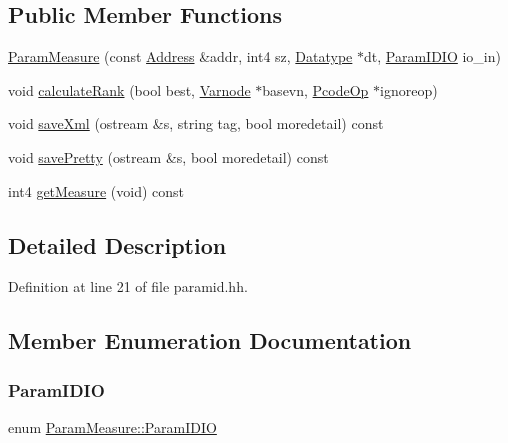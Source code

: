 \subsection*{Public Member Functions}
\begin{DoxyCompactItemize}
\item 
\mbox{\hyperlink{class_param_measure_a75cc959002e4d340d6f2196c48da1acf}{Param\+Measure}} (const \mbox{\hyperlink{class_address}{Address}} \&addr, int4 sz, \mbox{\hyperlink{class_datatype}{Datatype}} $\ast$dt, \mbox{\hyperlink{class_param_measure_a5d9dfe68f44efa9c011528a173f76fec}{Param\+I\+D\+IO}} io\+\_\+in)
\item 
void \mbox{\hyperlink{class_param_measure_a57b2f96e633cb22786292e004b9e37ae}{calculate\+Rank}} (bool best, \mbox{\hyperlink{class_varnode}{Varnode}} $\ast$basevn, \mbox{\hyperlink{class_pcode_op}{Pcode\+Op}} $\ast$ignoreop)
\item 
void \mbox{\hyperlink{class_param_measure_a53d9f454f92708e2e61a60c83222fe7a}{save\+Xml}} (ostream \&s, string tag, bool moredetail) const
\item 
void \mbox{\hyperlink{class_param_measure_a3f7a68d5a3978a999dd0690308710655}{save\+Pretty}} (ostream \&s, bool moredetail) const
\item 
int4 \mbox{\hyperlink{class_param_measure_a225033f51cfb4efe11c15e500de4217f}{get\+Measure}} (void) const
\end{DoxyCompactItemize}


\subsection{Detailed Description}


Definition at line 21 of file paramid.\+hh.



\subsection{Member Enumeration Documentation}
\mbox{\label{class_param_measure_a5d9dfe68f44efa9c011528a173f76fec}} 
\subsubsection{\texorpdfstring{ParamIDIO}{ParamIDIO}}
{\footnotesize\ttfamily enum \mbox{\hyperlink{class_param_measure_a5d9dfe68f44efa9c011528a173f76fec}{Param\+Measure\+::\+Param\+I\+D\+IO}}}

